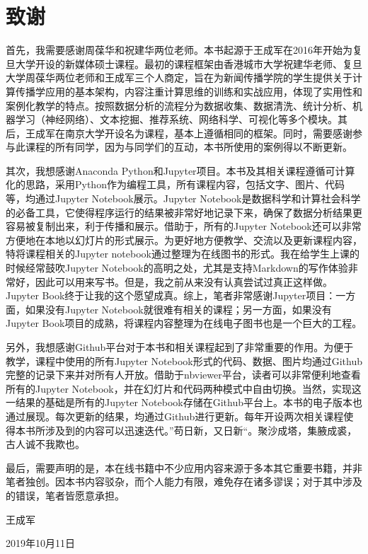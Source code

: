 \documentclass[letterpaper,10pt,english]{sphinxmanual}
\begin{document}
\chapter{致谢}
\label{\detokenize{index:id5}}
首先，我需要感谢周葆华和祝建华两位老师。本书起源于王成军在2016年开始为复旦大学开设的新媒体硕士课程。最初的课程框架由香港城市大学祝建华老师、复旦大学周葆华两位老师和王成军三个人商定，旨在为新闻传播学院的学生提供关于计算传播学应用的基本架构，内容注重计算思维的训练和实战应用，体现了实用性和案例化教学的特点。按照数据分析的流程分为数据收集、数据清洗、统计分析、机器学习（神经网络）、文本挖掘、推荐系统、网络科学、可视化等多个模块。其后，王成军在南京大学开设名为课程，基本上遵循相同的框架。同时，需要感谢参与此课程的所有同学，因为与同学们的互动，本书所使用的案例得以不断更新。

其次，我想感谢Anaconda Python和Jupyter项目。本书及其相关课程遵循可计算化的思路，采用Python作为编程工具，所有课程内容，包括文字、图片、代码等，均通过Jupyter Notebook展示。Jupyter Notebook是数据科学和计算社会科学的必备工具，它使得程序运行的结果被非常好地记录下来，确保了数据分析结果更容易被复制出来，利于传播和展示。借助于，所有的Jupyter Notebook还可以非常方便地在本地以幻灯片的形式展示。为更好地方便教学、交流以及更新课程内容，特将课程相关的Jupyter notebook通过整理为在线图书的形式。我在给学生上课的时候经常鼓吹Jupyter Notebook的高明之处，尤其是支持Markdown的写作体验非常好，因此可以用来写书。但是，我之前从来没有认真尝试过真正这样做。Jupyter Book终于让我的这个愿望成真。综上，笔者非常感谢Jupyter项目：一方面，如果没有Jupyter Notebook就很难有相关的课程；另一方面，如果没有Jupyter Book项目的成熟，将课程内容整理为在线电子图书也是一个巨大的工程。

另外，我想感谢Github平台对于本书和相关课程起到了非常重要的作用。为便于教学，课程中使用的所有Jupyter Notebook形式的代码、数据、图片均通过Github完整的记录下来并对所有人开放。借助于nbviewer平台，读者可以非常便利地查看所有的Jupyter Notebook，并在幻灯片和代码两种模式中自由切换。当然，实现这一结果的基础是所有的Jupyter Notebook存储在Github平台上。本书的电子版本也通过展现。每次更新的结果，均通过Github进行更新。每年开设两次相关课程使得本书所涉及到的内容可以迅速迭代。”苟日新，又日新“。聚沙成塔，集腋成裘，古人诚不我欺也。

最后，需要声明的是，本在线书籍中不少应用内容来源于多本其它重要书籍，并非笔者独创。因本书内容驳杂，而个人能力有限，难免存在诸多谬误；对于其中涉及的错误，笔者皆愿意承担。

王成军

2019年10月11日







\renewcommand{\indexname}{Index}
\printindex
\end{document}
